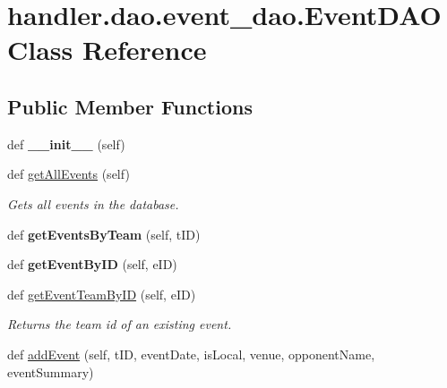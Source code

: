 \hypertarget{classhandler_1_1dao_1_1event__dao_1_1_event_d_a_o}{}\section{handler.\+dao.\+event\+\_\+dao.\+Event\+D\+AO Class Reference}
\label{classhandler_1_1dao_1_1event__dao_1_1_event_d_a_o}
\subsection*{Public Member Functions}
\begin{DoxyCompactItemize}
\item 
\mbox{\label{classhandler_1_1dao_1_1event__dao_1_1_event_d_a_o_a1c67394af1f87e5ac8eea5cfbdc18652}} 
def {\bfseries \+\_\+\+\_\+init\+\_\+\+\_\+} (self)
\item 
def \hyperlink{classhandler_1_1dao_1_1event__dao_1_1_event_d_a_o_aea3ae629c4b67d1a36f88a8faa633b64}{get\+All\+Events} (self)
\begin{DoxyCompactList}\small\item\em Gets all events in the database. \end{DoxyCompactList}\item 
\mbox{\label{classhandler_1_1dao_1_1event__dao_1_1_event_d_a_o_a9a546a3f9f5a5fff3bece5d2f7bc4ec1}} 
def {\bfseries get\+Events\+By\+Team} (self, t\+ID)
\item 
\mbox{\label{classhandler_1_1dao_1_1event__dao_1_1_event_d_a_o_a2d55d30055e25d450c1f2833143e4f39}} 
def {\bfseries get\+Event\+By\+ID} (self, e\+ID)
\item 
def \hyperlink{classhandler_1_1dao_1_1event__dao_1_1_event_d_a_o_a1f9f80d3b5442b3732c5cf63049cdd8c}{get\+Event\+Team\+By\+ID} (self, e\+ID)
\begin{DoxyCompactList}\small\item\em Returns the team id of an existing event. \end{DoxyCompactList}\item 
def \hyperlink{classhandler_1_1dao_1_1event__dao_1_1_event_d_a_o_a05ea963dea054f4258b89b6bcbf87945}{add\+Event} (self, t\+ID, event\+Date, is\+Local, venue, opponent\+Name, event\+Summary)

\end{DoxyCompactItemize}
